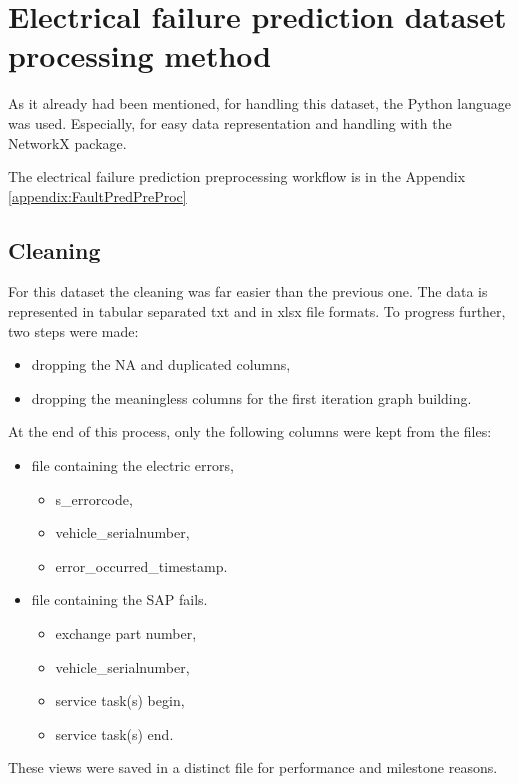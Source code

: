 \section{Electrical failure prediction dataset processing method}
As it already had been mentioned, for handling this dataset, the Python language was used. Especially, for easy data representation and handling with the NetworkX package. 

The electrical failure prediction preprocessing workflow is in the Appendix \ref{appendix:FaultPredPreProc}


	\subsection{Cleaning}
For this dataset the cleaning was far easier than the previous one. The data is represented in tabular separated txt and in xlsx file formats.
To progress further, two steps were made:
\begin{itemize}
			\item{dropping the NA and duplicated columns,}
			\item{dropping the meaningless columns for the first iteration graph building.}
\end{itemize}

At the end of this process, only the following columns were kept from the files:
\begin{itemize}
			\item{file containing the electric errors,}
			\begin{itemize}
				\item{s\_errorcode,}
				\item{vehicle\_serialnumber,}
				\item{error\_occurred\_timestamp.}
			\end{itemize}
			\item{file containing the SAP fails.}
			\begin{itemize}
				\item{exchange part number,}
				\item{vehicle\_serialnumber,}
				\item{service task(s) begin,}
				\item{service task(s) end.}
			\end{itemize}
\end{itemize}
These views were saved in a distinct file for performance and milestone reasons.
